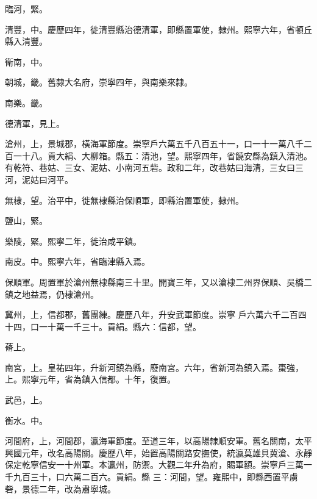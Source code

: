 \begin{pinyinscope}
 臨河，緊。



 清豐，中。慶歷四年，徙清豐縣治德清軍，即縣置軍使，隸州。熙寧六年，省頓丘縣入清豐。



 衛南，中。



 朝城，畿。舊隸大名府，崇寧四年，與南樂來隸。



 南樂。畿。



 德清軍，見上。



 滄州，上，景城郡，橫海軍節度。崇寧戶六萬五千八百五十一，口一十一萬八千二百一十八。貢大絹、大柳箱。縣五：清池，望。熙寧四年，省饒安縣為鎮入清池。有乾符、巷姑、三女、泥姑、小南河五砦。政和二年，改巷姑曰海清，三女曰三河，泥姑曰河平。



 無棣，望。治平中，徙無棣縣治保順軍，即縣治置軍使，隸州。



 鹽山，緊。



 樂陵，緊。熙寧二年，徙治咸平鎮。



 南皮。中。熙寧六年，省臨津縣入焉。



 保順軍。周置軍於滄州無棣縣南三十里。開寶三年，又以滄棣二州界保順、吳橋二鎮之地益焉，仍棣滄州。



 冀州，上，信都郡，舊團練。慶歷八年，升安武軍節度。崇寧
 戶六萬六千二百四十四，口一十萬一千三十。貢絹。縣六：信都，望。



 蓨上。



 南宮，上。皇祐四年，升新河鎮為縣，廢南宮。六年，省新河為鎮入焉。棗強，上。熙寧元年，省為鎮入信都。十年，復置。



 武邑，上。



 衡水。中。



 河間府，上，河間郡，瀛海軍節度。至道三年，以高陽隸順安軍。舊名關南，太平興國元年，改名高陽關。慶歷八年，始置高陽關路安撫使，統瀛莫雄貝冀滄、永靜保定乾寧信安一十州軍。本瀛州，防禦。大觀二年升為府，賜軍額。崇寧戶三萬一千九百三十，口六萬二百六。貢絹。縣
 三：河間，望。雍熙中，即縣西置平虜砦，景德二年，改為肅寧城。




\end{pinyinscope}
